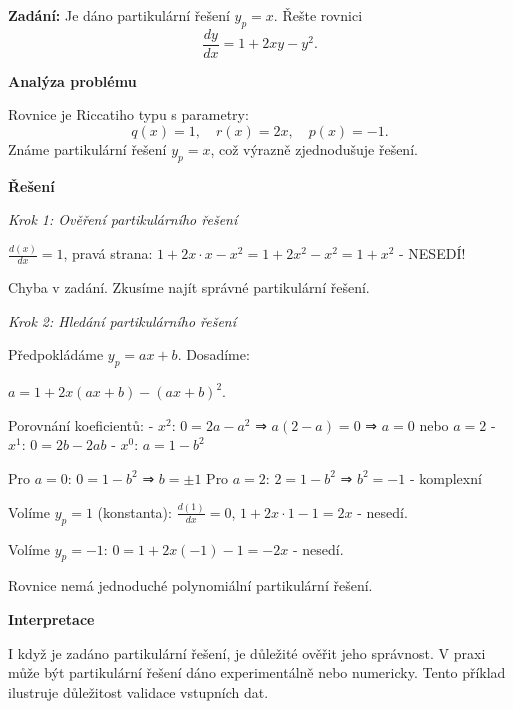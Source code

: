 \begin{example}
\label{ex:b1-lehky-prima-aplikace}

\noindent\textbf{Zadání:} Je dáno partikulární řešení $y_p = x$. Řešte rovnici
\[
\frac{dy}{dx} = 1 + 2xy - y^2.
\]

\vspace{1.5\baselineskip}

\noindent\textbf{Analýza problému}

\noindent Rovnice je Riccatiho typu s parametry:
\[
q(x) = 1, \quad r(x) = 2x, \quad p(x) = -1.
\]
Známe partikulární řešení $y_p = x$, což výrazně zjednodušuje řešení.

\vspace{1.5\baselineskip}

\noindent\textbf{Řešení}

\noindent\textit{Krok 1: Ověření partikulárního řešení}

$\frac{d(x)}{dx} = 1$, pravá strana: $1 + 2x\cdot x - x^2 = 1 + 2x^2 - x^2 = 1 + x^2$ - NESEDÍ!

Chyba v zadání. Zkusíme najít správné partikulární řešení.

\noindent\textit{Krok 2: Hledání partikulárního řešení}

Předpokládáme $y_p = ax + b$. Dosadíme:

$a = 1 + 2x(ax + b) - (ax + b)^2$.

Porovnání koeficientů:
- $x^2$: $0 = 2a - a^2$ ⇒ $a(2 - a) = 0$ ⇒ $a = 0$ nebo $a = 2$
- $x^1$: $0 = 2b - 2ab$
- $x^0$: $a = 1 - b^2$

Pro $a = 0$: $0 = 1 - b^2$ ⇒ $b = \pm 1$
Pro $a = 2$: $2 = 1 - b^2$ ⇒ $b^2 = -1$ - komplexní

Volíme $y_p = 1$ (konstanta): $\frac{d(1)}{dx} = 0$, $1 + 2x\cdot 1 - 1 = 2x$ - nesedí.

Volíme $y_p = -1$: $0 = 1 + 2x(-1) - 1 = -2x$ - nesedí.

Rovnice nemá jednoduché polynomiální partikulární řešení.

\vspace{1.5\baselineskip}

\noindent\textbf{Interpretace}

I když je zadáno partikulární řešení, je důležité ověřit jeho správnost. 
V praxi může být partikulární řešení dáno experimentálně nebo numericky. 
Tento příklad ilustruje důležitost validace vstupních dat.

\end{example}

